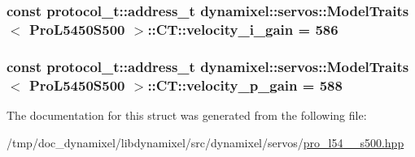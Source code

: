 \subsubsection[{\texorpdfstring{velocity\+\_\+i\+\_\+gain}{velocity_i_gain}}]{\setlength{\rightskip}{0pt plus 5cm}const {\bf protocol\+\_\+t\+::address\+\_\+t} {\bf dynamixel\+::servos\+::\+Model\+Traits}$<$ {\bf Pro\+L5450\+S500} $>$\+::C\+T\+::velocity\+\_\+i\+\_\+gain = 586\hspace{0.3cm}{\ttfamily [static]}}\hypertarget{structdynamixel_1_1servos_1_1_model_traits_3_01_pro_l5450_s500_01_4_1_1_c_t_ae7bb82fa0cd9843bdba0b103a2fdfc88}{}\label{structdynamixel_1_1servos_1_1_model_traits_3_01_pro_l5450_s500_01_4_1_1_c_t_ae7bb82fa0cd9843bdba0b103a2fdfc88}
\subsubsection[{\texorpdfstring{velocity\+\_\+p\+\_\+gain}{velocity_p_gain}}]{\setlength{\rightskip}{0pt plus 5cm}const {\bf protocol\+\_\+t\+::address\+\_\+t} {\bf dynamixel\+::servos\+::\+Model\+Traits}$<$ {\bf Pro\+L5450\+S500} $>$\+::C\+T\+::velocity\+\_\+p\+\_\+gain = 588\hspace{0.3cm}{\ttfamily [static]}}\hypertarget{structdynamixel_1_1servos_1_1_model_traits_3_01_pro_l5450_s500_01_4_1_1_c_t_a908357245724f3ef69886a072fbca951}{}\label{structdynamixel_1_1servos_1_1_model_traits_3_01_pro_l5450_s500_01_4_1_1_c_t_a908357245724f3ef69886a072fbca951}


The documentation for this struct was generated from the following file\+:\begin{DoxyCompactItemize}
\item 
/tmp/doc\+\_\+dynamixel/libdynamixel/src/dynamixel/servos/\hyperlink{pro__l54__50__s500_8hpp}{pro\+\_\+l54\+\_\+\_\+s500.\+hpp}\end{DoxyCompactItemize}

